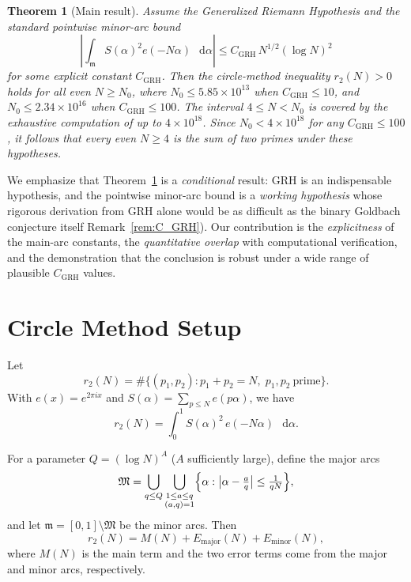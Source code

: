 \documentclass[11pt,a4paper]{article}
\theoremstyle{plain}
\newtheorem{theorem}{Theorem}[section]
\theoremstyle{definition}
\theoremstyle{remark}
\numberwithin{equation}{section}
\numberwithin{table}{section}
\def\diff{\mathop{}\!\mathrm{d}}
\newcommand{\frakM}{\mathfrak{M}}
\newcommand{\frakm}{\mathfrak{m}}
\begin{document}
\begin{theorem}[Main result]
\label{thm:main}
Assume the Generalized Riemann Hypothesis and the standard pointwise
minor-arc bound
\begin{equation}
  \left|\int_{\mathfrak{m}}S(\alpha)^2 e(-N\alpha)\,\diff\alpha\right|
  \le C_{\mathrm{GRH}}\,N^{1/2}(\log N)^2
\end{equation}
for some explicit constant $C_{\mathrm{GRH}}$.  Then the circle-method
inequality $r_2(N)>0$ holds for all even $N\ge N_0$, where
$N_0\le 5.85\times 10^{13}$ when $C_{\mathrm{GRH}}\le 10$, and
$N_0\le 2.34\times 10^{16}$ when $C_{\mathrm{GRH}}\le 100$.
The interval $4\le N<N_0$ is covered by the exhaustive computation of
\cite{Oliveira2013} up to $4\times 10^{18}$.  Since
$N_0<4\times 10^{18}$ for any $C_{\mathrm{GRH}}\le 100$, it follows
that every even $N\ge 4$ is the sum of two primes under these hypotheses.
\end{theorem}

We emphasize that Theorem~\ref{thm:main} is a \emph{conditional} result:
GRH is an indispensable hypothesis, and the pointwise minor-arc bound
is a \emph{working hypothesis} whose rigorous derivation from GRH alone
would be as difficult as the binary Goldbach conjecture itself 
Remark~\ref{rem:C_GRH}).  Our contribution is the \emph{explicitness}
of the main-arc constants, the \emph{quantitative overlap} with
computational verification, and the demonstration that the conclusion
is robust under a wide range of plausible $C_{\mathrm{GRH}}$ values.

\section{Circle Method Setup}
\label{sec:circle}

Let
\begin{equation}
  r_2(N) = \#\{(p_1,p_2) : p_1+p_2=N,\; p_1,p_2\ \text{prime}\}.
\end{equation}
With $e(x)=e^{2\pi i x}$ and $S(\alpha)=\sum_{p\le N}e(p\alpha)$, we have
\begin{equation}
  r_2(N) = \int_0^1 S(\alpha)^2\,e(-N\alpha)\,\diff\alpha.
\end{equation}

For a parameter $Q=(\log N)^A$ ($A$ sufficiently large), define the major
arcs
\begin{equation}
  \frakM = \bigcup_{q\le Q}\bigcup_{\substack{1\le a\le q\\(a,q)=1}}
  \Bigl\{\alpha:\bigl|\alpha-\tfrac{a}{q}\bigr|\le \tfrac{1}{qN}\Bigr\},
\end{equation}
and let $\frakm=[0,1]\setminus\frakM$ be the minor arcs.  Then
\begin{equation}
  r_2(N) = M(N) + E_{\mathrm{major}}(N) + E_{\mathrm{minor}}(N),
\end{equation}
where $M(N)$ is the main term and the two error terms come from the major
and minor arcs, respectively.
\end{document}
